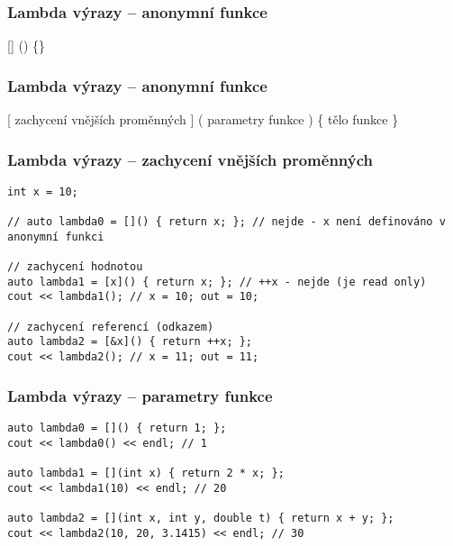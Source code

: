 \begin{frame}[fragile]
\frametitle{Lambda výrazy -- anonymní funkce}
\begin{noteblock}{}
\begin{center}
[] () \{\}
\end{center}
\end{noteblock}
\end{frame}

\begin{frame}[fragile]
\frametitle{Lambda výrazy -- anonymní funkce}
\begin{noteblock}{}
\begin{center}
[ zachycení vnějších proměnných ] ( parametry funkce ) \{ tělo funkce \}
\end{center}
\end{noteblock}
\end{frame}

\begin{frame}[fragile]
\frametitle{Lambda výrazy -- zachycení vnějších proměnných}
\begin{yesblock}
\begin{lstlisting}
int x = 10;

// auto lambda0 = []() { return x; }; // nejde - x není definováno v anonymní funkci

// zachycení hodnotou
auto lambda1 = [x]() { return x; }; // ++x - nejde (je read only)
cout << lambda1(); // x = 10; out = 10;

// zachycení referencí (odkazem)
auto lambda2 = [&x]() { return ++x; };
cout << lambda2(); // x = 11; out = 11;
\end{lstlisting}
\end{yesblock}
\end{frame}


\begin{frame}[fragile]
\frametitle{Lambda výrazy -- parametry funkce}
\begin{yesblock}
\begin{lstlisting}
auto lambda0 = []() { return 1; };
cout << lambda0() << endl; // 1

auto lambda1 = [](int x) { return 2 * x; };
cout << lambda1(10) << endl; // 20

auto lambda2 = [](int x, int y, double t) { return x + y; };
cout << lambda2(10, 20, 3.1415) << endl; // 30
\end{lstlisting}
\end{yesblock}
\end{frame}

